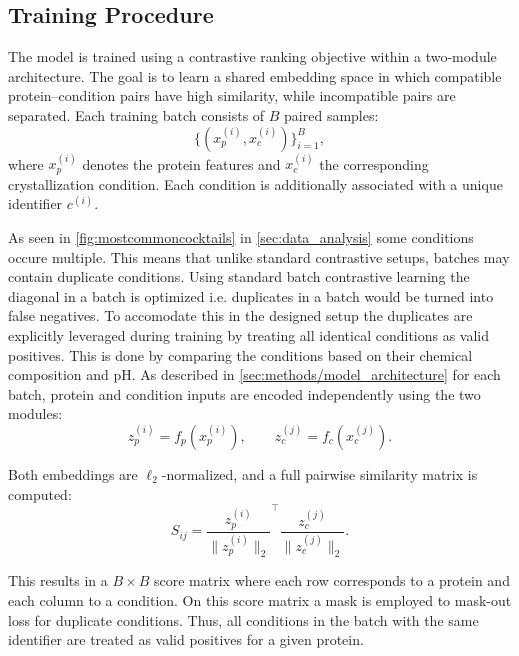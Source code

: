 \subsection{Training Procedure}\label{sec:methods/training/pipeline}

The model is trained using a contrastive ranking objective within a two-module architecture. The goal is to learn a shared embedding space in which compatible protein--condition pairs have high similarity, while incompatible pairs are separated.
Each training batch consists of $B$ paired samples:
\begin{equation}
    \{(x_p^{(i)}, x_c^{(i)})\}_{i=1}^{B},
\end{equation}
where $x_p^{(i)}$ denotes the protein features and $x_c^{(i)}$ the corresponding crystallization condition. Each condition is additionally associated with a unique identifier $c^{(i)}$.

As seen in \autoref{fig:mostcommoncocktails} in \autoref{sec:data_analysis} some conditions occure multiple. This means that unlike standard contrastive setups, batches may contain duplicate conditions. Using standard batch contrastive learning the diagonal in a batch is optimized i.e. duplicates in a batch would be turned into false negatives. To accomodate this in the designed setup the duplicates are explicitly leveraged during training by treating all identical conditions as valid positives. This is done by comparing the conditions based on their chemical composition and pH. 
As described in \autoref{sec:methods/model_architecture} for each batch, protein and condition inputs are encoded independently using the two modules:
\begin{equation}
    z_p^{(i)} = f_p(x_p^{(i)}), \qquad
    z_c^{(j)} = f_c(x_c^{(j)}).
\end{equation}

Both embeddings are $\ell_2$-normalized, and a full pairwise similarity matrix is computed:
\begin{equation}
    S_{ij} = \frac{z_p^{(i)}}{\|z_p^{(i)}\|_2}^\top
             \frac{z_c^{(j)}}{\|z_c^{(j)}\|_2}.
\end{equation}

This results in a $B \times B$ score matrix where each row corresponds to a protein and each column to a condition.
On this score matrix a mask is employed to mask-out loss for duplicate conditions. Thus, all conditions in the batch with the same identifier are treated as valid positives for a given protein.

